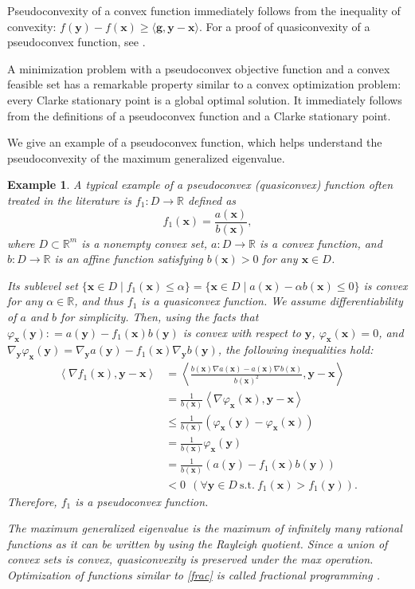 \documentclass[sn-mathphys,Numbered]{sn-jnl}%
\theoremstyle{thmstyleone}%
\theoremstyle{thmstyletwo}%
\newtheorem{example}{Example}%
\theoremstyle{thmstylethree}%
\newcommand{\e}[1]{\begin{equation}#1\end{equation}}
\newcommand{\prn}[1]{\left(#1\right)}
\newcommand{\ang}[1]{\left\langle#1\right\rangle}
\def\coloneq{\mathrel{\mathop:}=}
\def\rm{\mathbb{R}^m}
\begin{document}
Pseudoconvexity of a convex function immediately follows from the inequality of convexity: $f(\bm{y})-f(\bm{x})\ge\langle \bm{g},\bm{y}-\bm{x} \rangle$. For a proof of quasiconvexity of a pseudoconvex function, see \cite{soleimani07}.

A minimization problem with a pseudoconvex objective function and a convex feasible set has a remarkable property similar to a convex optimization problem: every Clarke stationary point is a global optimal solution. It immediately follows from the definitions of a pseudoconvex function and a Clarke stationary point.

We give an example of a pseudoconvex function, which helps understand the pseudoconvexity of the maximum generalized eigenvalue.

\begin{example}
\label{ex1}
A typical example of a pseudoconvex (quasiconvex) function often treated in the literature \cite{bian18,hu15,kiwiel01} is $f_1:D\to\mathbb{R}$ defined as
\e{
f_1(\bm{x}) = \frac{a(\bm{x})}{b(\bm{x})},
\label{frac}
}
where $D\subset\rm$ is a nonempty convex set, $a:D\to\mathbb{R}$ is a convex function, and $b:D\to\mathbb{R}$ is an affine function satisfying $b(\bm{x})>0$ for any $\bm{x}\in D$.

Its sublevel set $\{\bm{x}\in D \mid f_1(\bm{x})\le\alpha\}=\{\bm{x}\in D \mid a(\bm{x})-\alpha b(\bm{x})\le 0\}$ is convex for any $\alpha\in\mathbb{R}$, and thus $f_1$ is a quasiconvex function. We assume differentiability of $a$ and $b$ for simplicity. Then, using the facts that $\varphi_{\bm{x}}(\bm{y})\coloneq a(\bm{y})-f_1(\bm{x})b(\bm{y})$ is convex with respect to $\bm{y}$, $\varphi_{\bm{x}}(\bm{x})=0$, and $\nabla_{\bm{y}}\varphi_{\bm{x}}(\bm{y})=\nabla_{\bm{y}} a(\bm{y})-f_1(\bm{x})\nabla_{\bm{y}} b(\bm{y})$,
the following inequalities hold:
\begin{align}
\ang{\nabla f_1(\bm{x}),\bm{y}-\bm{x}}
& = \ang{\frac{b(\bm{x})\nabla a(\bm{x})-a(\bm{x})\nabla b(\bm{x})}{b(\bm{x})^2},\bm{y}-\bm{x}}\\
& = \frac{1}{b(\bm{x})}\ang{\nabla\varphi_{\bm{x}}(\bm{x}),\bm{y}-\bm{x}}\\
& \le \frac{1}{b(\bm{x})}\prn{\varphi_{\bm{x}}(\bm{y})-\varphi_{\bm{x}}(\bm{x})}\\
& = \frac{1}{b(\bm{x})}\varphi_{\bm{x}}(\bm{y})\\
& = \frac{1}{b(\bm{x})}\prn{a(\bm{y})-f_1(\bm{x})b(\bm{y})}\\
& < 0\ \ (\forall\bm{y}\in D\ \mathrm{s.t.}\ f_1(\bm{x})>f_1(\bm{y})).
\end{align}
Therefore, $f_1$ is a pseudoconvex function.

The maximum generalized eigenvalue is the maximum of infinitely many rational functions as it can be written by using the Rayleigh quotient. Since a union of convex sets is convex, quasiconvexity is preserved under the max operation. Optimization of functions similar to \eqref{frac} is called fractional programming \cite{bot17,crouzeix91}.
\end{example}
\end{document}
